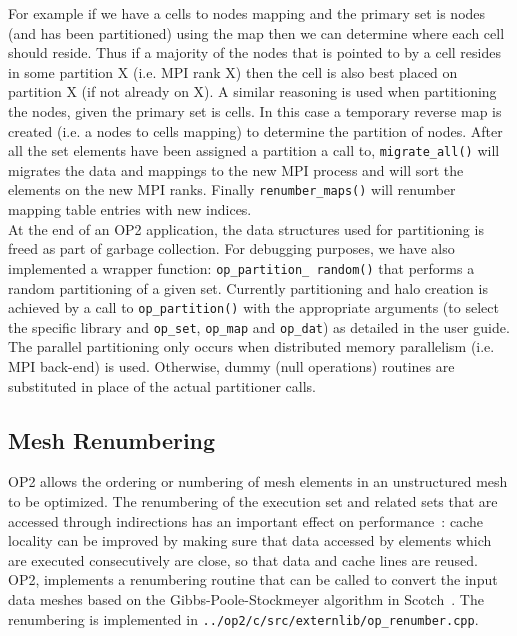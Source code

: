 \documentclass[11pt]{article}
\begin{document}
For example if we have a cells to nodes mapping and the primary set is nodes (and has been partitioned) using the
map then we can determine where each cell should reside. Thus if a majority of the nodes that is pointed to by a cell
resides in some partition X (i.e. MPI rank X) then the cell is also best placed on partition X (if not already on X). A
similar reasoning is used when partitioning the nodes, given the primary set is cells. In this case a temporary reverse
map is created (i.e. a nodes to cells mapping) to determine the partition of nodes. After all the set elements have been
assigned a partition a call to, \texttt{migrate\_all()} will migrates the data and mappings to the new MPI process and
will sort the elements on the new MPI ranks. Finally \texttt{renumber\_maps()} will renumber mapping table entries with
new indices.\\

\noindent At the end of an OP2 application, the data structures used for partitioning is freed as part of garbage
collection. For debugging purposes, we have also implemented a wrapper function: \texttt{op\_partition\_ random()} that
performs a random partitioning of a given set. Currently partitioning and halo creation is achieved by a call to
\texttt{op\_partition()} with the appropriate arguments (to select the specific library and \texttt{op\_set},
\texttt{op\_map} and \texttt{op\_dat}) as detailed in the user guide. The parallel partitioning only occurs when
distributed memory parallelism (i.e. MPI back-end) is used. Otherwise, dummy (null operations) routines are substituted
in place of the actual partitioner calls.

\subsection{Mesh Renumbering}\label{subsec/meshrenum}

OP2 allows the ordering or numbering of mesh elements in an unstructured mesh to be optimized. The renumbering of
the execution set and related sets that are accessed through indirections has an important effect on
performance~\cite{Burgess}: cache locality can be improved by making sure that data accessed by elements which are
executed consecutively are close, so that data and cache lines are reused. OP2, implements a renumbering routine that
can be called to convert the input data meshes based on the Gibbs-Poole-Stockmeyer algorithm in Scotch~\cite{PTScotch}.
The renumbering is implemented in \texttt{../op2/c/src/externlib/op\_renumber.cpp}.
\end{document}

